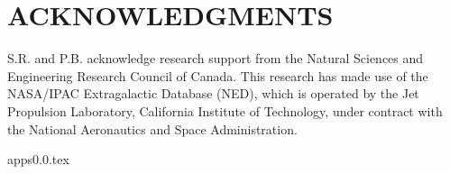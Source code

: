 \documentclass[useAMS,usenatbib]{mn2e}
\begin{document}
\section*{ACKNOWLEDGMENTS}
S.R. and P.B. acknowledge research support from the Natural Sciences and Engineering Research Council of Canada. This research has made use of the NASA/IPAC Extragalactic Database (NED), which is operated by the Jet Propulsion Laboratory, California Institute of Technology, under contract with the National Aeronautics and Space Administration.



{apps0.0.tex}
\end{document}
